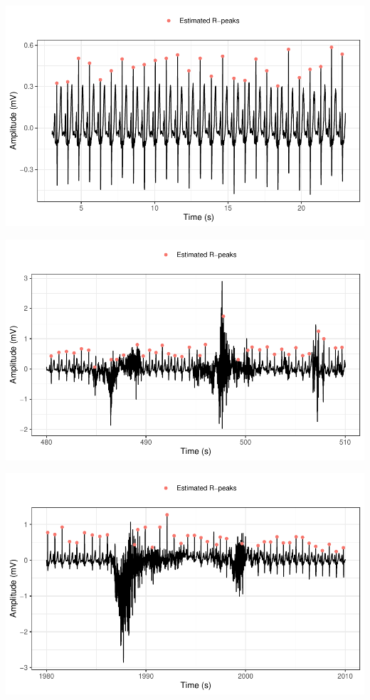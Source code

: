 \documentclass[
]{article}
\begin{document}
\begin{center}\includegraphics{report_files/figure-latex/rr-interval-5} \end{center}

\begin{center}\includegraphics{report_files/figure-latex/rr-interval-6} \end{center}

\begin{center}\includegraphics{report_files/figure-latex/rr-interval-7} \end{center}
\end{document}
